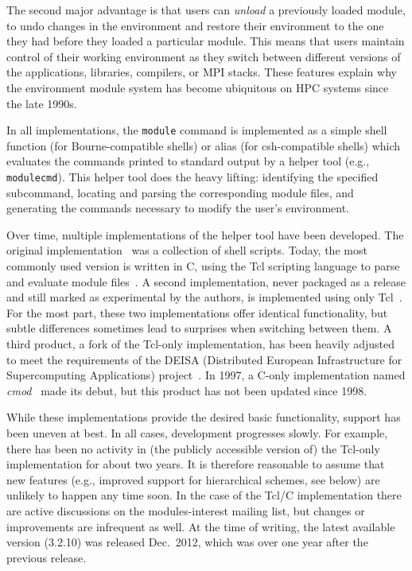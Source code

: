 \noindent
The second major advantage is that users can \emph{unload} a previously
loaded module, to undo changes in the environment and restore their
environment to the one they had before they loaded a particular module.  This means
that users maintain control of their working environment as they switch between
different versions of the applications, libraries, compilers, or MPI stacks.  These features explain why the environment module
system has become ubiquitous on HPC systems since the late 1990s.


%

In all implementations, the \texttt{\small module} command
is implemented as a simple shell function (for Bourne-compatible shells) or
alias (for csh-compatible shells) which evaluates the commands printed to standard output by a
helper tool (e.g., \texttt{\small modulecmd}). This helper tool
does the heavy lifting: identifying the specified subcommand,
locating and parsing the corresponding module files, and generating the
commands necessary to modify the user's environment.

Over time, multiple implementations of the helper tool
have been developed. The original implementation~\cite{furlani91} was a collection
of shell scripts. Today, the most commonly used version is written in C, using
the Tcl scripting language to parse and evaluate module files~\cite{em}. A second
implementation, never packaged as a release and still marked as
experimental by the authors, is implemented using only Tcl~\cite{em}. For the most
part, these two implementations
offer identical functionality, but subtle differences sometimes lead to surprises when switching between them. A third product,
a
fork of the Tcl-only implementation, has been heavily adjusted to meet
the requirements of the DEISA (Distributed European Infrastructure for
Supercomputing Applications) project~\cite{wikiDEISA}.  In
1997, a C-only implementation named \emph{cmod}~\cite{cmod} made its debut, but this product has not been updated since 1998.



While these implementations provide the desired basic functionality, support has been uneven at best. In all cases, development
progresses slowly. For example, there has been no activity in
(the publicly accessible version of) the Tcl-only
implementation for about two years. It is therefore reasonable to assume that new features (e.g., improved support for hierarchical schemes, see below) are
unlikely to happen any time soon. In the case of the Tcl/C implementation
there are active discussions on the modules-interest mailing list, but
changes or improvements are infrequent as well. At the time of writing, the
latest available version (3.2.10) was released Dec.~2012, which was over one year
after the previous release.

